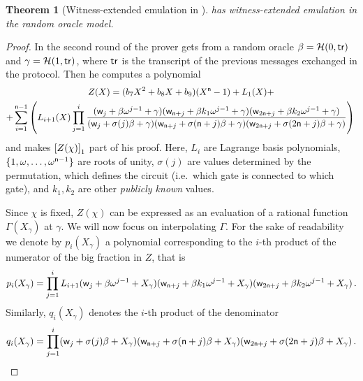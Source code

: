 \documentclass[runningheads,11pt]{llncs}
\newtheorem{theorem}{Theorem}%
\theoremstyle{definition}
\begin{document}
\begin{theorem}[Witness-extended emulation in \plonk{}]
  \plonk{} has witness-extended emulation in the random oracle model.
\end{theorem}
\begin{proof}
In the second round of \plonk{} the prover gets from a random oracle $\beta = \mathcal{H}(0, \mathsf{tr})$ and $\gamma = \mathcal{H}(1, \mathsf{tr})$, where $\mathsf{tr}$ is the transcript of the previous messages exchanged in the protocol. Then he computes a polynomial
\begin{multline*}
  \label{eq:Z}
  Z(X) = (b_7 X^2 + b_8 X + b_9) (X^{\mathsf{n}} - 1) + L_1 (X) + \\
   + \sum_{i = 1}^{\mathsf{n} - 1}\left(L_{i + 1}(X) \prod_{j = 1}^{i}
  \frac{(\mathsf{w}_j + \beta \omega^{j - 1} + \gamma)(\mathsf{w}_{\mathsf{n} + j} + \beta k_1 \omega^{j - 1} + \gamma) (\mathsf{w}_{2\mathsf{n} + j} + \beta k_2 \omega^{j - 1} + \gamma)}
  {(\mathsf{w}_j + \sigma(j)\beta + \gamma)(\mathsf{w}_{\mathsf{n} + j} + \sigma(\mathsf{n} + j)\beta + \gamma)(\mathsf{w}_{2\mathsf{n} + j} + \sigma (2\mathsf{n} + j) \beta + \gamma)}
  \right)\,
\end{multline*}
and makes $\left[Z(\chi)\right]_{1}$ part of his proof.
Here, $L_i$ are Lagrange basis polynomials, $\{1, \omega, \ldots, \omega^{\mathsf{n} - 1}\}$ are roots of unity, $\sigma(j)$ are values determined by the permutation, which defines the circuit (i.e.~which gate is connected to which gate), and $k_1, k_2$ are other \emph{publicly known} values.

Since $\chi$ is fixed, $Z(\chi)$ can be expressed as an evaluation of a rational function $\Gamma(X_\gamma)$ at $\gamma$. We will now focus on interpolating $\Gamma$.
For the sake of readability we denote by $p_i (X_\gamma)$ a polynomial corresponding to the $i$-th product of the numerator of the big fraction in $Z$, that is
\[
  p_i(X_\gamma) = \prod_{j = 1}^{i} L_{i + 1} (\mathsf{w}_j + \beta \omega^{j - 1} + X_\gamma)(\mathsf{w}_{\mathsf{n} + j} + \beta k_1 \omega^{j - 1} + X_\gamma) (\mathsf{w}_{2\mathsf{n} + j} + \beta k_2 \omega^{j - 1} + X_\gamma)\,.
\]
Similarly, $q_i (X_\gamma)$ denotes the $i$-th product of the denominator
\[
  q_i(X_\gamma) = \prod_{j = 1}^{i} (\mathsf{w}_j + \sigma(j)\beta + X_\gamma)(\mathsf{w}_{\mathsf{n} + j} + \sigma(\mathsf{n} + j)\beta + X_\gamma)(\mathsf{w}_{2\mathsf{n} + j} + \sigma (2\mathsf{n} + j) \beta + X_\gamma)\,.
\]


\end{proof}
\end{document}
